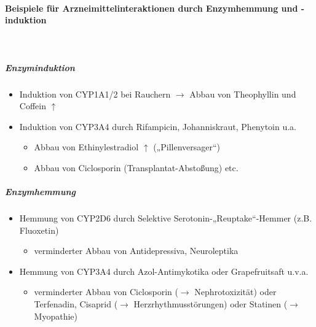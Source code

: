\documentclass[10pt,a4paper]{report}
\begin{document}
\paragraph{Beispiele für Arzneimittelinteraktionen 
durch Enzymhemmung und -induktion} \mbox{}\\
\subparagraph{Enzyminduktion}
\begin{itemize}
	\item Induktion von CYP1A1/2 bei Rauchern $\rightarrow$ Abbau von Theophyllin und Coffein $\uparrow$
	\item Induktion von CYP3A4 durch Rifampicin, Johanniskraut, Phenytoin u.a. 
	\begin{itemize}%
  \renewcommand{\labelitemi}{$\rightarrow$}
 \item Abbau von Ethinylestradiol $\uparrow$ („Pillenversager“)
 \item Abbau von Ciclosporin (Transplantat-Abstoßung) etc.
\end{itemize}
\end{itemize}
\subparagraph{Enzymhemmung}
\begin{itemize}
	\item Hemmung von CYP2D6 durch Selektive Serotonin-„Reuptake“-Hemmer (z.B. Fluoxetin)
	\begin{itemize}
	\renewcommand{\labelitemi}{$\rightarrow$}
	\item verminderter	 Abbau von Antidepressiva, Neuroleptika
	\end{itemize}
	\item Hemmung von CYP3A4 durch Azol-Antimykotika oder Grapefruitsaft u.v.a.
	\begin{itemize}
		\renewcommand{\labelitemi}{$\rightarrow$}
		\item verminderter Abbau von Ciclosporin ($\rightarrow$ Nephrotoxizität) 
	     oder Terfenadin, Cisaprid ($\rightarrow$ Herzrhythmusstörungen) oder Statinen ($\rightarrow$ Myopathie)
	\end{itemize}
\end{itemize}
\end{document}
